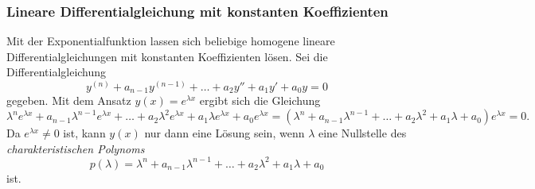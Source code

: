 \subsubsection{Lineare Differentialgleichung mit konstanten Koeffizienten}
Mit der Exponentialfunktion lassen sich beliebige homogene lineare
Differentialgleichungen mit konstanten Koeffizienten lösen.
Sei die Differentialgleichung
\[
y^{(n)} + a_{n-1}y^{(n-1)} + \dots + a_2y'' + a_1y' + a_0y = 0
\]
gegeben.
Mit dem Ansatz $y(x)=e^{\lambda x}$ ergibt sich die Gleichung
\[
\lambda^n e^{\lambda x}
+
a_{n-1}\lambda^{n-1} e^{\lambda x}
+
\dots
+
a_2\lambda^2e^{\lambda x}
+
a_1\lambda e^{\lambda x}
+
a_0e^{\lambda x}
=
(\lambda^n + a_{n-1}\lambda^{n-1} + \dots + a_2\lambda^2 + a_1\lambda + a_0)
e^{\lambda x}
=
0.
\]
Da $e^{\lambda x}\ne 0$ ist, kann $y(x)$ nur dann eine Lösung sein, wenn
$\lambda$ eine Nullstelle des {\em charakteristischen Polynoms}
\[
p(\lambda)
=
\lambda^n
+
a_{n-1}\lambda^{n-1}
+
\dots
+
a_2\lambda^2
+
a_1\lambda
+
a_0
\]
ist.

